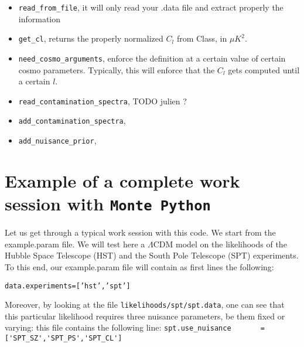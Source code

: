 \documentclass[10pt]{article}
\newcommand{\MP}{\texttt{Monte Python}}
\begin{document}
  \begin{itemize}
    \item \verb?read_from_file?, it will only read your .data file and extract
      properly the information
    \item \verb?get_cl?, returns the properly normalized $C_l$ from Class, in $\mu K^2$.
    \item \verb?need_cosmo_arguments?, enforce the definition at a certain
      value of certain cosmo parameters. Typically, this will enforce that the
      $C_l$ gets computed until a certain $l$.
    \item \verb?read_contamination_spectra?, TODO julien ?
    \item \verb?add_contamination_spectra?,
    \item \verb?add_nuisance_prior?,
  \end{itemize}


  \newpage
  \section{Example of a complete work session with \MP}
  Let us get through a typical work session with this code. We start from the
  example.param file. We will test here a $\Lambda$CDM model on the likelihoods
  of the Hubble Space Telescope (HST) and the South Pole Telescope (SPT)
  experiments.\\

  To this end, our example.param file will contain as first lines the following:
  
  \begin{alltt}
    data.experiments = ['hst','spt']
  \end{alltt}

  Moreover, by looking at the file \verb?likelihoods/spt/spt.data?, one can see
  that this particular likelihood requires three nuisance parameters, be them
  fixed or varying: this file contains the following line:
  \verb?spt.use_nuisance	   = ['SPT_SZ','SPT_PS','SPT_CL']?
\end{document}
